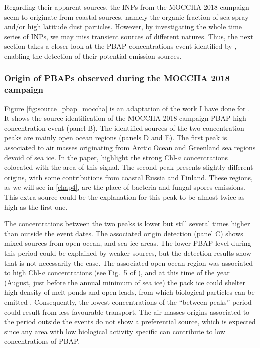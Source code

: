     Regarding their apparent sources, the INPs from the MOCCHA 2018 campaign seem to originate from coastal sources, namely the organic fraction of sea spray and/or high latitude dust particles.
    However, by investigating the whole time series of INPs, we may miss transient sources of different natures. Thus, the next section takes a closer look at the PBAP concentrations event identified by \citet{kojoj_arctic_2024}, enabling the detection of their potential emission sources.


        \subsubsection{Origin of PBAPs observed during the MOCCHA 2018 campaign}
        \label{sec:source_pbap_moccha}
        Figure \ref{fig:source_pbap_moccha} is an adaptation of the work I have done for \citet{kojoj_arctic_2024}. It shows the source identification of the MOCCHA 2018 campaign PBAP high concentration event (panel B).
        The identified sources of the two concentration peaks are mainly open ocean regions (panels D and E). The first peak is associated to air masses originating from Arctic Ocean and Greenland sea regions devoid of sea ice. In the paper, \citet{kojoj_arctic_2024} highlight the strong Chl-$a$ concentrations colocated with the area of this signal.
        The second peak presents slightly different origins, with some contributions from coastal Russia and Finland. These regions, as we will see in \cref{chap4}, are the place of bacteria and fungal spores emissions. This extra source could be the explanation for this peak to be almost twice as high as the first one.

        The concentrations between the two peaks is lower but still several times higher than outside the event dates. The associated origin detection (panel C) shows mixed sources from open ocean, and sea ice areas. The lower PBAP level during this period could be explained by weaker sources, but the detection results show that is not necessarily the case.
 The associated open ocean region was associated to high Chl-$a$ concentrations (see Fig.~5 of \citet{kojoj_arctic_2024}), and at this time of the year (August, just before the annual minimum of sea ice) the pack ice could shelter high density of melt ponds and open leads, from which biological particles can be emitted \citep{dallosto_arctic_2017, hartmann_terrestrial_2021}.
 Consequently, the lowest concentrations of the ``between peaks'' period could result from less favourable transport.
        The air masses origins associated to the period outside the events do not show a preferential source, which is expected since any area with low biological activity specific can contribute to low concentrations of PBAP.

